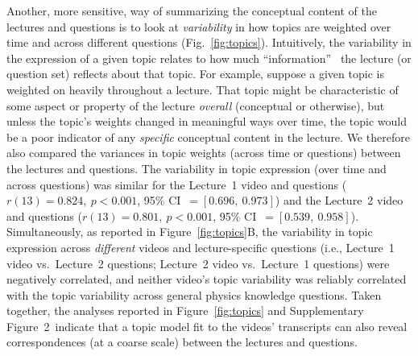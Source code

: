 \documentclass[10pt]{article}
\newcommand{\topicWeights}{2}
\providecommand{\DIFaddend}{} %
\DeclareRobustCommand{\DIFaddend}{\DIFOaddend \let\includegraphics\DIFOincludegraphics} %
\begin{document}
\DIFaddend Another, more sensitive, way of summarizing the conceptual content of the
lectures and questions is to look at \textit{variability} in how topics are
weighted over time and across different questions (Fig.~\ref{fig:topics}).
Intuitively, the variability in the expression of a given topic relates to how
much ``information''~\citep{Fish22} the lecture (or question set) reflects
about that topic. For example, suppose a given topic is weighted on heavily
throughout a lecture. That topic might be characteristic of some aspect or
property of the lecture \textit{overall} (conceptual or otherwise), but unless
the topic's weights changed in meaningful ways over time, the topic would be a
poor indicator of any \textit{specific} conceptual content in the lecture. We
therefore also compared the variances in topic weights (across time or
questions) between the lectures and questions. The variability in topic
expression (over time and across questions) was similar for the Lecture~1 video
and questions ($r(13) = 0.824,~p<0.001$, 95\% CI~$= [0.696,~0.973]$) and the
Lecture~2 video and questions ($r(13) = 0.801,~p<0.001$, 95\% CI~$=
[0.539,~0.958]$). Simultaneously, as reported in Figure~\ref{fig:topics}B, the
variability in topic expression across \textit{different} videos and
lecture-specific questions (i.e., Lecture~1 video vs.~Lecture~2 questions;
Lecture~2 video vs.~Lecture~1 questions) were negatively correlated, and
neither video's topic variability was reliably correlated with the topic
variability across general physics knowledge questions. Taken together, the
analyses reported in Figure~\ref{fig:topics} and Supplementary
Figure~\topicWeights~indicate that a topic model fit to the videos' transcripts
can also reveal correspondences (at a coarse scale) between the lectures and
questions.
\end{document}

